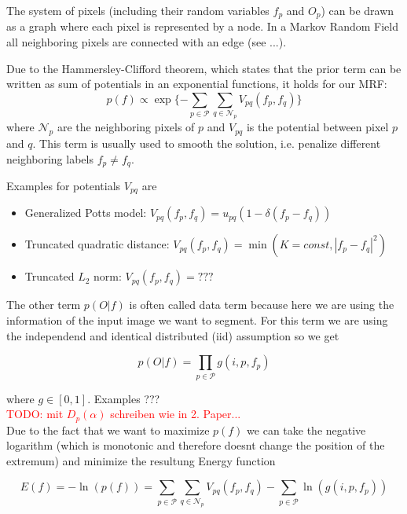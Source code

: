 \documentclass{scrartcl}[12pt, halfparskip]
\newcommand{\todo}[1]{\textcolor{red}{TODO: #1}}
\begin{document}
The system of pixels (including their random variables $f_p$ and $O_p$) can be drawn as a graph where each pixel is represented by a node. In a Markov Random Field all neighboring pixels are connected with an edge (see ...). 

Due to the Hammersley-Clifford theorem, which states that the prior term can be written as sum of potentials in an exponential functions, it holds for our MRF:
\begin{equation}
	p(f) \propto \exp\{ - \sum\limits_{p \in \mathcal{P}} \sum\limits_{q \in \mathcal{N}_p} V_{pq} (f_p, f_q) \}
\end{equation}
where $\mathcal{N}_p$ are the neighboring pixels of $p$ and $V_{pq}$ is the potential between pixel $p$ and $q$. This term is usually used to smooth the solution, i.e. penalize different neighboring labels $f_p \neq f_q$.

Examples for potentials $V_{pq}$ are
\begin{itemize}
	\item Generalized Potts model: $V_{pq}(f_p, f_q) = u_{pq} (1 - \delta(f_p - f_q))$
	\item Truncated quadratic distance: $V_{pq}(f_p, f_q) = \min (K=const, |f_p - f_q|^2)$
	\item Truncated $L_2$ norm: $V_{pq}(f_p, f_q) = ???$
\end{itemize}

The other term $p(O|f)$ is often called data term because here we are using the information of the input image we want to segment. For this term we are using the independend and identical distributed (iid) assumption so we get

\begin{equation}
	p(O|f) = \prod\limits_{p \in \mathcal{P}} g(i, p, f_p)
\end{equation}

where $g \in [0, 1]$. Examples ??? \\
\todo{mit $D_p(\alpha)$ schreiben wie in 2. Paper...} \\

Due to the fact that we want to maximize $p(f)$ we can take the negative logarithm (which is monotonic and therefore doesnt change the position of the extremum) and minimize the resultung Energy function

\begin{equation}
E(f) = - \ln(p(f)) = \sum\limits_{p \in \mathcal{P}} \sum\limits_{q \in \mathcal{N}_p} V_{pq} (f_p, f_q) - \sum\limits_{p \in \mathcal{P}} \ln(g(i, p, f_p))
\end{equation}
\label{eq:energy-function}
\end{document}
